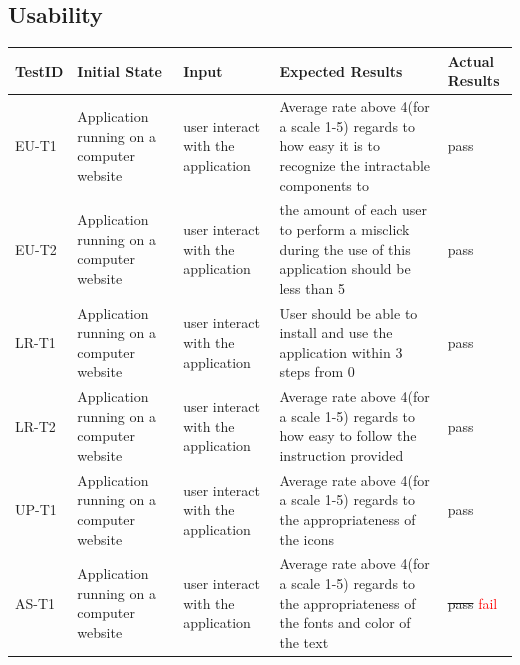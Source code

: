 \documentclass[12pt, titlepage]{article}
\begin{document}
\subsection{Usability}
\begin{tabular}{ |p{2cm}| p{3cm}| p{4cm}| p{4cm}|p{2cm}|  } 
 \hline
 TestID & Initial State & Input & Expected Results & Actual Results \\ 
 \hline
 EU-T1 & Application running on a computer website & user interact with the application & Average rate above 4(for a scale 1-5) regards to how easy it is to recognize the intractable components to  & pass\\
  \hline
 EU-T2 & Application running on a computer website & user interact with the application & the amount of each user to perform a misclick during the use of this application should be less than 5  & pass\\
  \hline
 LR-T1 & Application running on a computer website & user interact with the application & User should be able to install and use the application within 3 steps from 0 & pass\\
\hline
 LR-T2 & Application running on a computer website & user interact with the application & Average rate above 4(for a scale 1-5) regards to how easy to follow the instruction provided & pass\\
\hline
 UP-T1 & Application running on a computer website & user interact with the application & Average rate above 4(for a scale 1-5) regards to the appropriateness of the icons  & pass\\
 \hline
 AS-T1 & Application running on a computer website & user interact with the application & Average rate above 4(for a scale 1-5) regards to the appropriateness of the fonts and color of the text  & \sout{pass} \textcolor{red}{fail}\\
 \hline
\end{tabular}	
\end{document}
